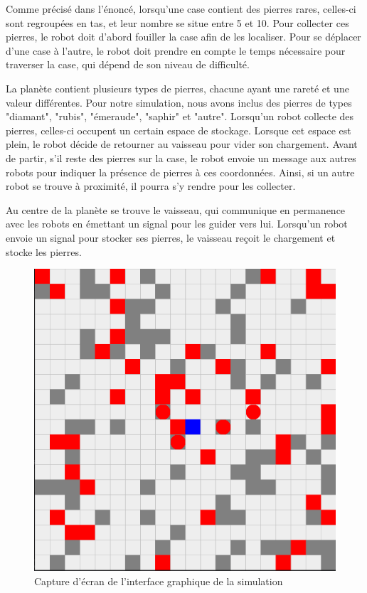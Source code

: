 \documentclass{article}
\begin{document}
Comme précisé dans l'énoncé, lorsqu'une case contient des pierres rares, celles-ci sont regroupées en tas, et leur nombre se situe entre 5 et 10. Pour collecter ces pierres, le robot doit d'abord fouiller la case afin de les localiser. Pour se déplacer d'une case à l'autre, le robot doit prendre en compte le temps nécessaire pour traverser la case, qui dépend de son niveau de difficulté.

La planète contient plusieurs types de pierres, chacune ayant une rareté et une valeur différentes. Pour notre simulation, nous avons inclus des pierres de types "diamant", "rubis", "émeraude", "saphir" et "autre". Lorsqu'un robot collecte des pierres, celles-ci occupent un certain espace de stockage. Lorsque cet espace est plein, le robot décide de retourner au vaisseau pour vider son chargement. Avant de partir, s'il reste des pierres sur la case, le robot envoie un message aux autres robots pour indiquer la présence de pierres à ces coordonnées. Ainsi, si un autre robot se trouve à proximité, il pourra s'y rendre pour les collecter.

Au centre de la planète se trouve le vaisseau, qui communique en permanence avec les robots en émettant un signal pour les guider vers lui. Lorsqu'un robot envoie un signal pour stocker ses pierres, le vaisseau reçoit le chargement et stocke les pierres.

\begin{figure}[H]
    \begin{minipage}{\textwidth}
        \centering
        \includegraphics[scale=0.35]{./img/env1.png}
        \caption{Capture d'écran de l'interface graphique de la simulation}
        \label{fig:ResAg1}
    \end{minipage}
\end{figure}
\end{document}
